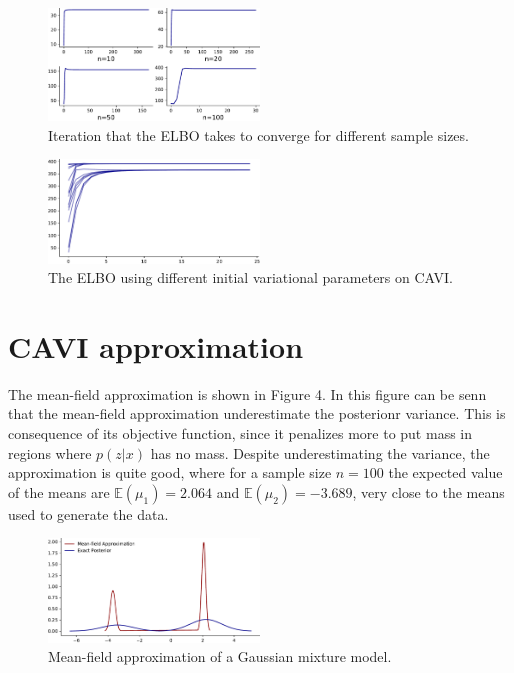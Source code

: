 \documentclass{article}
\begin{document}
\begin{figure}[!h]
    \includegraphics[width=0.5\textwidth]{img/elbo_sample.pdf} 
    \caption{Iteration that the ELBO takes to converge for different sample sizes.}
\end{figure}

\begin{figure}[!h]
    \includegraphics[width=0.5\textwidth]{img/elbo_init.pdf} 
    \caption{The ELBO using different initial variational parameters on CAVI.}
\end{figure}

\section{CAVI approximation}

The mean-field approximation is shown in Figure 4. In this figure can be senn that the mean-field approximation underestimate the posterionr variance. This is consequence of its objective function, since it penalizes more to put mass in regions where $p(z|x)$ has no mass. Despite underestimating the variance, the approximation is quite good, where for a sample size $n=100$ the expected value of the means are $\mathbb{E}(\mu_{1}) = 2.064$ and $\mathbb{E}(\mu_{2})=-3.689$, very close to the means used to generate the data.

\begin{figure}[!h]
    \includegraphics[width=0.5\textwidth]{img/cavi_approx.pdf} 
    \caption{Mean-field approximation of a Gaussian mixture model.}
\end{figure}
\end{document}

